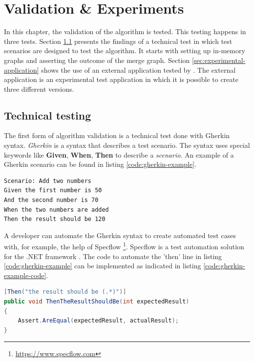 \chapter{Validation \& Experiments} \label{chapter:validation-experiments}

In this chapter, the validation of the algorithm is tested. This testing happens in three tests. Section \ref{sec:scenarios-testing} presents the findings of a technical test in which test scenarios are designed to test the algorithm. It starts with setting up in-memory graphs and asserting the outcome of the merge graph. Section \ref{sec:experimental-application} shows the use of an external application tested by \testar. The external application is an experimental test application in which it is possible to create three different versions.


\section{Technical testing} \label{sec:scenarios-testing}
The first form of algorithm validation is a technical test done with Gherkin syntax. \textit{Gherkin} is a syntax that describes a test scenario. The syntax uses special keywords like \textbf{Given}, \textbf{When}, \textbf{Then} to describe a \textit{scenario}. An example of a Gherkin scenario can be found in listing \ref{code:gherkin-example}.

\begin{lstlisting}[language=Gherkin, caption=Calculator test example, label=code:gherkin-example]
Scenario: Add two numbers
Given the first number is 50
And the second number is 70
When the two numbers are added
Then the result should be 120
\end{lstlisting}

A developer can automate the Gherkin syntax to create automated test cases with, for example, the help of Specflow \footnote{\url{https://www.specflow.com}}. Specflow is a test automation solution for the .NET framework \cite{specflow}. The code to automate the 'then' line in listing \ref{code:gherkin-example} can be implemented as indicated in listing \ref{code:gherkin-example-code}.

\begin{lstlisting}[language=Java, caption=Implementation of a 'then' line, label=code:gherkin-example-code]
[Then("the result should be (.*)")]
public void ThenTheResultShouldBe(int expectedResult)
{
    Assert.AreEqual(expectedResult, actualResult);
}
\end{lstlisting}

